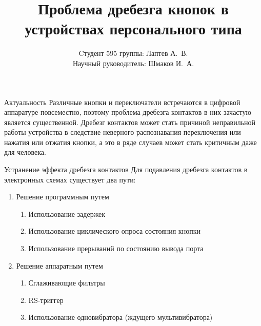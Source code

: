 \documentclass[12pt,a4paper,mathserif]{beamer}
\author[Лаптев А.В.]{{Cтудент 595 группы: Лаптев А.~В.}\\
{Научный руководитель: Шмаков И.~А.}}
\title{Проблема дребезга кнопок в устройствах персонального типа}
\begin{document}
\begin{frame}
\maketitle
\end{frame}

\begin{frame}{Актуальность}
    \setlength{\parindent}{0.5cm}
    Различные кнопки и переключатели встречаются в цифровой аппаратуре повсеместно, поэтому проблема дребезга контактов в них зачастую является существенной. Дребезг контактов может стать причиной неправильной работы устройства в следствие неверного распознавания переключения или нажатия или отжатия кнопки, а это в ряде случаев может стать критичным даже для человека.
\end{frame}

\begin{frame}{Устранение эффекта дребезга контактов}
    \setlength{\parindent}{0.5cm}
    Для подавления дребезга контактов в электронных схемах существует два пути:

    \begin{enumerate}
        \item Решение программным путем
        
        \begin{enumerate}
            \item Использование задержек
    
            \item Использование циклического опроса состояния кнопки
        
            \item Использование прерываний по состоянию вывода порта 
        \end{enumerate}
    
        \item Решение аппаратным путем

        \begin{enumerate}
            \item Сглаживающие фильтры
    
            \item RS-триггер
        
            \item Использование одновибратора (ждущего мультивибратора)
        \end{enumerate}
    \end{enumerate}
\end{frame}
\end{document}
